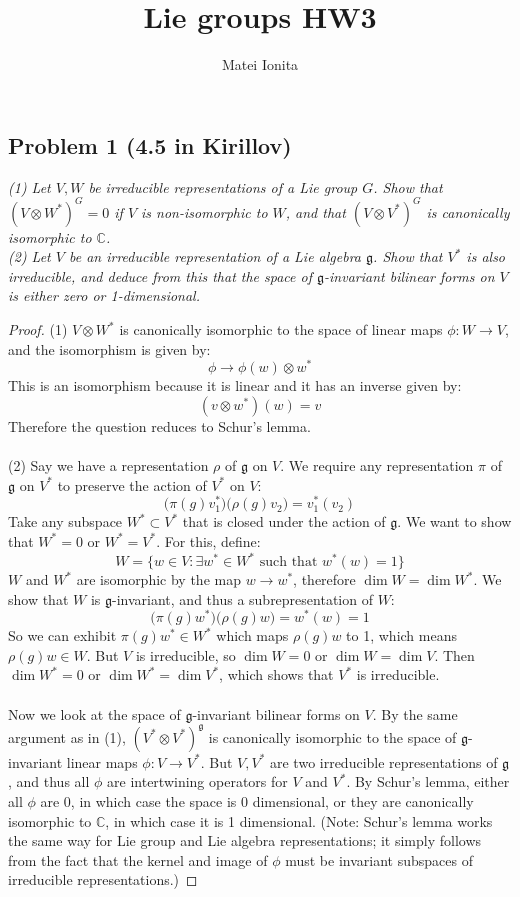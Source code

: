 \documentclass[12 pt]{article}
\title{Lie groups HW3}
\author{Matei Ionita}
\newcommand{\C}{\mathbb{C}}
\newcommand{\fr}{\mathfrak}
\begin{document}
  \maketitle

\subsection*{Problem 1 (4.5 in Kirillov)}
\emph{(1) Let $V,W$ be irreducible representations of a Lie group $G$. Show that $(V \otimes W^*)^G = 0$ if $V$ is non-isomorphic to $W$, and that $(V \otimes V^*)^G$ is canonically isomorphic to $\C$.
\\
(2) Let $V$ be an irreducible representation of a Lie algebra $\fr g$. Show that $V^*$ is also irreducible, and deduce from this that the space of $\fr g$-invariant bilinear forms on $V$ is either zero or 1-dimensional.}
\begin{proof}
(1) $V \otimes W^*$ is canonically isomorphic to the space of linear maps $\phi : W\to V$, and the isomorphism is given by:
\[       \phi  \to   \phi(w) \otimes w^*    \]
This is an isomorphism because it is linear and it has an inverse given by:
\[        (v \otimes w^*) (w) = v      \]
Therefore the question reduces to Schur's lemma.
\\
\\
(2) Say we have a representation $\rho$ of $\fr g$ on $V$. We require any representation $\pi$ of $\fr g$ on $V^*$ to preserve the action of $V^*$ on $V$:
\[     \big(  \pi(g) v_1^* \big) \big( \rho(g) v_2 \big) = v_1^*(v_2)  \]
Take any subspace $W^* \subset V^*$ that is closed under the action of $\fr g$. We want to show that $W^* = 0$ or $W^* = V^*$. For this, define:
\[      W =   \{ w \in V :  \exists w^* \in W^* \text{ such that } w^*(w) = 1 \}       \]
$W$ and $W^*$ are isomorphic by the map $w \to w^*$, therefore $\dim W = \dim W^*$. We show that $W$ is $\fr g$-invariant, and thus a subrepresentation of $W$:
\[       \big(  \pi(g) w^* \big) \big( \rho(g) w \big)  = w^*(w) = 1  \]
So we can exhibit $\pi(g) w^* \in W^*$ which maps $ \rho(g) w$ to 1, which means $ \rho(g) w \in W$. But $V$ is irreducible, so $\dim W = 0$ or $\dim W = \dim V$. Then $\dim W^* = 0$ or $\dim W^* = \dim V^*$, which shows that $V^*$ is irreducible.
\\
\\
Now we look at the space of $\fr g$-invariant bilinear forms on $V$. By the same argument as in (1), $(V^* \otimes V^*)^{\fr g}$ is canonically isomorphic to the space of $\fr g$-invariant linear maps $\phi : V \to V^*$. But $V, V^*$ are two irreducible representations of $\fr g$, and thus all $\phi$ are intertwining operators for $V$ and $V^*$. By Schur's lemma, either all $\phi$ are 0, in which case the space is 0 dimensional, or they are canonically isomorphic to $\C$, in which case it is 1 dimensional. (Note: Schur's lemma works the same way for Lie group and Lie algebra representations; it simply follows from the fact that the kernel and image of $\phi$ must be invariant subspaces of irreducible representations.)
\end{proof}
\end{document}
